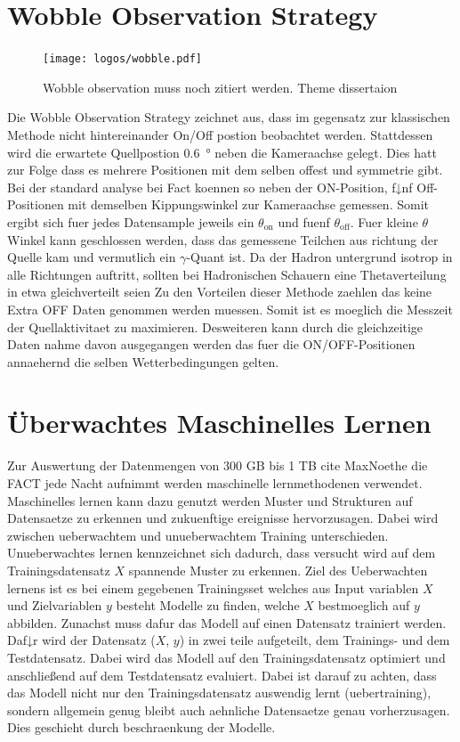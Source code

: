 \section{Wobble Observation Strategy}
\begin{figure}
  \texttt{[image: logos/wobble.pdf]}
  \caption{Wobble observation muss noch zitiert werden. Theme dissertaion}
\end{figure}
Die Wobble Observation Strategy zeichnet aus, dass im gegensatz zur klassischen Methode nicht hintereinander On/Off postion beobachtet werden. Stattdessen wird die erwartete Quellpostion \SI{0.6}{\degree} neben die Kameraachse gelegt. Dies hatt zur Folge dass es mehrere Positionen mit dem selben offest und symmetrie gibt. Bei der standard analyse bei Fact koennen so neben der ON-Position, f↓nf Off-Positionen mit demselben Kippungswinkel zur Kameraachse gemessen. Somit ergibt sich fuer jedes Datensample jeweils ein $\theta_\text{on}$ und fuenf $\theta_\text{off}$. Fuer kleine $\theta$ Winkel kann geschlossen werden, dass das gemessene Teilchen aus richtung der Quelle kam und vermutlich ein $\gamma$-Quant ist. Da der Hadron untergrund isotrop in alle Richtungen auftritt, sollten bei Hadronischen Schauern eine Thetaverteilung in etwa gleichverteilt seien  Zu den Vorteilen dieser Methode zaehlen das keine Extra OFF Daten genommen werden muessen. Somit ist es moeglich die Messzeit der Quellaktivitaet zu maximieren. Desweiteren kann durch die gleichzeitige Daten nahme davon ausgegangen werden das fuer die ON/OFF-Positionen annaehernd die selben Wetterbedingungen gelten. 

\section{Überwachtes Maschinelles Lernen}
Zur Auswertung der Datenmengen von 300 GB bis 1 TB cite MaxNoethe die FACT jede Nacht aufnimmt werden maschinelle lernmethodenen verwendet. Maschinelles lernen kann dazu genutzt werden Muster und Strukturen auf Datensaetze zu erkennen und zukuenftige ereignisse hervorzusagen. Dabei wird zwischen ueberwachtem und unueberwachtem Training unterschieden. Unueberwachtes lernen kennzeichnet sich dadurch, dass versucht wird auf dem Trainingsdatensatz $X$ spannende Muster zu erkennen.  Ziel des Ueberwachten lernens ist es bei einem gegebenen Trainingsset welches aus Input variablen $X$ und Zielvariablen $y$ besteht Modelle zu finden, welche $X$ bestmoeglich auf $y$ abbilden. \newline
Zunachst muss dafur das Modell auf einen Datensatz trainiert werden. Daf↓r wird der Datensatz ($X$, $y$) in zwei teile aufgeteilt, dem Trainings- und dem Testdatensatz. Dabei wird das Modell auf den Trainingsdatensatz optimiert und anschließend auf dem Testdatensatz evaluiert. Dabei ist darauf zu achten, dass das Modell nicht nur den Trainingsdatensatz auswendig lernt (uebertraining), sondern allgemein genug bleibt auch aehnliche Datensaetze genau vorherzusagen. Dies geschieht durch beschraenkung der Modelle.


